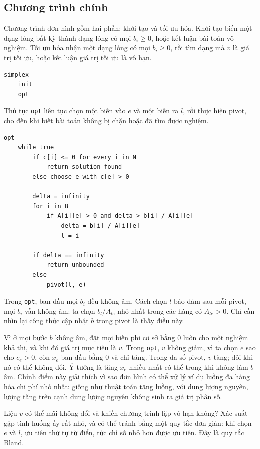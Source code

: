 \documentclass[11pt]{article}
\begin{document}
\subsection{Chương trình chính}

Chương trình đơn hình gồm hai phần: khởi tạo và tối ưu hóa. Khởi tạo biến một
dạng lỏng bất kỳ thành dạng lỏng có mọi $b_i\ge 0$, hoặc kết luận bài toán vô
nghiệm. Tối ưu hóa nhận một dạng lỏng có mọi $b_i\ge 0$, rồi tìm dạng mà $v$
là giá trị tối ưu, hoặc kết luận giá trị tối ưu là vô hạn.

\begin{verbatim}
simplex
    init
    opt
\end{verbatim}

Thủ tục \texttt{opt} liên tục chọn một biến vào $e$ và một biến ra $l$, rồi
thực hiện pivot, cho đến khi biết bài toán không bị chặn hoặc đã tìm được
nghiệm.

\begin{verbatim}
opt
    while true
        if c[i] <= 0 for every i in N
            return solution found
        else choose e with c[e] > 0

        delta = infinity
        for i in B
            if A[i][e] > 0 and delta > b[i] / A[i][e]
                delta = b[i] / A[i][e]
                l = i

        if delta == infinity
            return unbounded
        else
            pivot(l, e)
\end{verbatim}

Trong \texttt{opt}, ban đầu mọi $b_i$ đều không âm. Cách chọn $l$ bảo đảm sau
mỗi pivot, mọi $b_i$ vẫn không âm: ta chọn $b_l/A_{le}$ nhỏ nhất trong các
hàng có $A_{le}>0$. Chỉ cần nhìn lại công thức cập nhật $b$ trong pivot là
thấy điều này.

Vì ở mọi bước $b$ không âm, đặt mọi biến phi cơ sở bằng $0$ luôn cho một
nghiệm khả thi, và khi đó giá trị mục tiêu là $v$. Trong \texttt{opt}, $v$
không giảm, vì ta chọn $e$ sao cho $c_e>0$, còn $x_e$ ban đầu bằng $0$ và chỉ
tăng. Trong đa số pivot, $v$ tăng; đôi khi nó có thể không đổi. Ý tưởng là
tăng $x_e$ nhiều nhất có thể trong khi không làm $b$ âm. Chính điểm này giải
thích vì sao đơn hình có thể xử lý ví dụ luồng đa hàng hóa chi phí nhỏ nhất:
giống như thuật toán tăng luồng, với dung lượng nguyên, lượng tăng trên cạnh
dung lượng nguyên không sinh ra giá trị phân số.

Liệu $v$ có thể mãi không đổi và khiến chương trình lặp vô hạn không? Xác
suất gặp tình huống ấy rất nhỏ, và có thể tránh bằng một quy tắc đơn giản:
khi chọn $e$ và $l$, ưu tiên thứ tự từ điển, tức chỉ số nhỏ hơn được ưu tiên.
Đây là quy tắc Bland.
\end{document}
